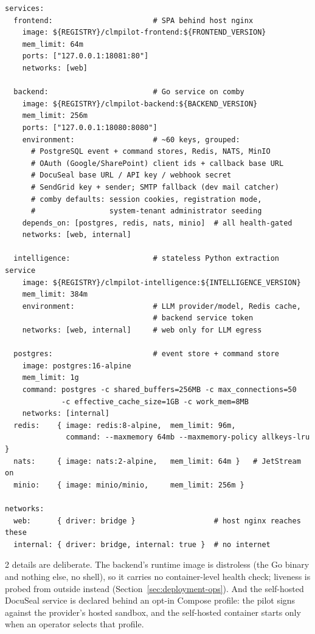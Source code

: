 \begin{lstlisting}[language=yamlcfg]
services:
  frontend:                       # SPA behind host nginx
    image: ${REGISTRY}/clmpilot-frontend:${FRONTEND_VERSION}
    mem_limit: 64m
    ports: ["127.0.0.1:18081:80"]
    networks: [web]

  backend:                        # Go service on comby
    image: ${REGISTRY}/clmpilot-backend:${BACKEND_VERSION}
    mem_limit: 256m
    ports: ["127.0.0.1:18080:8080"]
    environment:                  # ~60 keys, grouped:
      # PostgreSQL event + command stores, Redis, NATS, MinIO
      # OAuth (Google/SharePoint) client ids + callback base URL
      # DocuSeal base URL / API key / webhook secret
      # SendGrid key + sender; SMTP fallback (dev mail catcher)
      # comby defaults: session cookies, registration mode,
      #                 system-tenant administrator seeding
    depends_on: [postgres, redis, nats, minio]  # all health-gated
    networks: [web, internal]

  intelligence:                   # stateless Python extraction service
    image: ${REGISTRY}/clmpilot-intelligence:${INTELLIGENCE_VERSION}
    mem_limit: 384m
    environment:                  # LLM provider/model, Redis cache,
                                  # backend service token
    networks: [web, internal]     # web only for LLM egress

  postgres:                       # event store + command store
    image: postgres:16-alpine
    mem_limit: 1g
    command: postgres -c shared_buffers=256MB -c max_connections=50
             -c effective_cache_size=1GB -c work_mem=8MB
    networks: [internal]
  redis:    { image: redis:8-alpine,  mem_limit: 96m,
              command: --maxmemory 64mb --maxmemory-policy allkeys-lru }
  nats:     { image: nats:2-alpine,   mem_limit: 64m }   # JetStream on
  minio:    { image: minio/minio,     mem_limit: 256m }

networks:
  web:      { driver: bridge }                  # host nginx reaches these
  internal: { driver: bridge, internal: true }  # no internet
\end{lstlisting}

2 details are deliberate. The backend's runtime image is distroless
(the Go binary and nothing else, no shell), so it carries no
container-level health check; liveness is probed from outside instead
(Section~\ref{sec:deployment-ops}). And the self-hosted DocuSeal service is declared behind
an opt-in Compose profile: the pilot signs against the provider's
hosted sandbox, and the self-hosted container starts only when an
operator selects that profile.

